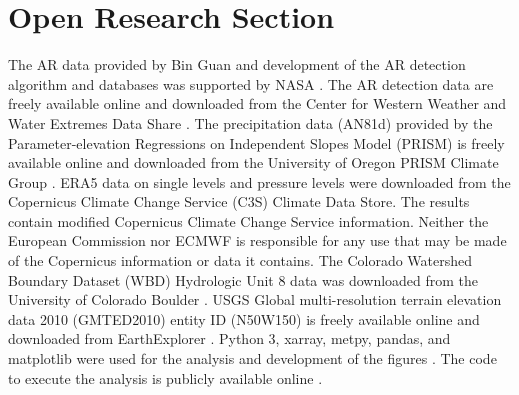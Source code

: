 \documentclass[draft]{agujournal2019}
\begin{document}
%
%

\section*{Open Research Section}

The AR data provided by Bin Guan and development of the AR detection algorithm and databases was supported by NASA \cite{Guan2022GlobalDataset}. The  AR detection data are freely available online and downloaded from the Center for Western Weather and Water Extremes Data Share \cite{Rutz2014RutzDataset}. The precipitation data (AN81d) provided by the Parameter-elevation Regressions on Independent Slopes Model (PRISM) is freely available online and downloaded from the University of Oregon PRISM Climate Group \cite{PRISMClimateGroup2004PRISMData}. ERA5 data on single levels \cite{Hersbach2018a} and pressure levels \cite{Hersbach2018} were downloaded from the Copernicus Climate Change Service (C3S) Climate Data Store. The results contain modified Copernicus Climate Change Service information. Neither the European Commission nor ECMWF is responsible for any use that may be made of the Copernicus information or data it contains. The Colorado Watershed Boundary Dataset (WBD) Hydrologic Unit 8 data was downloaded from the University of Colorado Boulder \cite{U.S.GeologicalSurvey2015ColoradoDataset}. USGS Global multi-resolution terrain elevation data 2010 (GMTED2010) entity ID (N50W150) is freely available online and downloaded from EarthExplorer \cite{Danielson2011GlobalDataset}. Python 3, xarray, metpy, pandas, and matplotlib were used for the analysis and development of the figures \cite{thomas_a_caswell_2022_6982547, 
 May2017, metpy, hoyer2017xarray, xarray_v2022.12.0, Hunter:2007, the_pandas_development_team_2022_7344967, VanRossum2009}. The code to execute the analysis is publicly available online \cite{Nash2025CO_top-decile_precipitation_ARs:Software}. 
\end{document}

